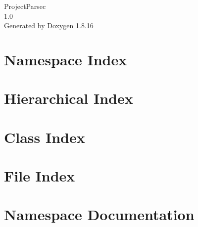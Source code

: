 \let\mypdfximage\pdfximage\def\pdfximage{\immediate\mypdfximage}\documentclass[twoside]{book}
\newcommand{\+}{\discretionary{\mbox{\scriptsize$\hookleftarrow$}}{}{}}
\newcommand{\clearemptydoublepage}{%
  \newpage{\pagestyle{empty}\cleardoublepage}%
}
\begin{document}
\hypersetup{pageanchor=false,
             bookmarksnumbered=true,
             pdfencoding=unicode
            }
\begin{titlepage}
\vspace*{7cm}
\begin{center}%
{\Large Project\+Parsec \\[1ex]\large 1.\+0 }\\
\vspace*{1cm}
{\large Generated by Doxygen 1.8.16}\\
\end{center}
\end{titlepage}
\clearemptydoublepage
{}
\tableofcontents
\clearemptydoublepage
{}
\hypersetup{pageanchor=true}

\chapter{Namespace Index}

\chapter{Hierarchical Index}

\chapter{Class Index}

\chapter{File Index}

\chapter{Namespace Documentation}








\end{document}

